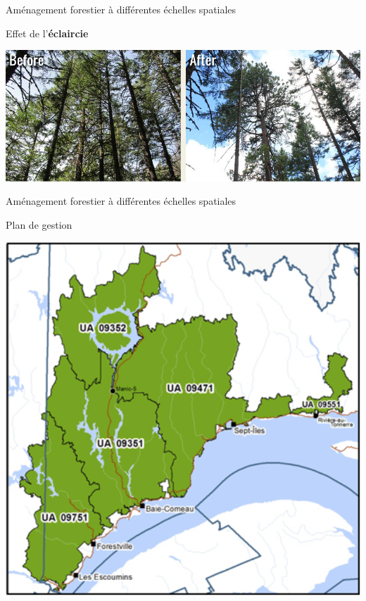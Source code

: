 \documentclass[11pt, compress, aspectratio=1610]{beamer}
\begin{document}
\begin{frame}{Aménagement forestier à différentes échelles spatiales}
\protect\hypertarget{amuxe9nagement-forestier-uxe0-diffuxe9rentes-uxe9chelles-spatiales}{}

Effet de l’\textbf{éclaircie}

\centering

\includegraphics[scale=0.338]{figures/thinning}

\par

\end{frame}

\begin{frame}{Aménagement forestier à différentes échelles spatiales}
\protect\hypertarget{amuxe9nagement-forestier-uxe0-diffuxe9rentes-uxe9chelles-spatiales-1}{}

\vspace*{-7mm}

Plan de gestion

\centering

\includegraphics[scale=0.28]{figures/planGestion}

\par

\end{frame}
\end{document}
